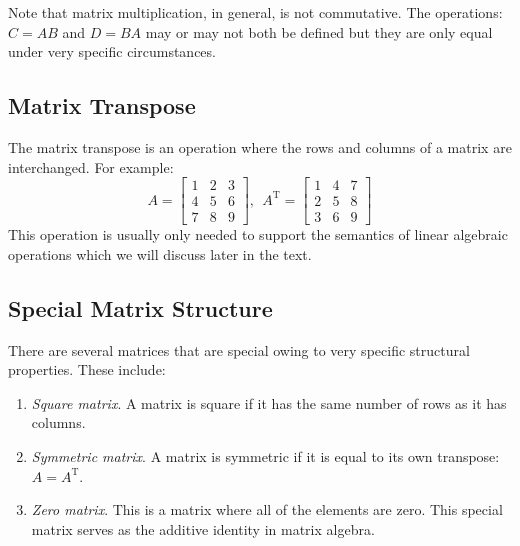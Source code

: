 Note that matrix multiplication, in general, is not commutative.  The operations: $C = AB$ and $D=BA$ may or may not both be defined but they are only equal under very specific circumstances.

\subsection{Matrix Transpose}
The matrix transpose is an operation where the rows and columns of a matrix are interchanged.  For example:
\begin{equation*}A = 
\left[
\begin{matrix}
1 & 2 & 3 \\
4 & 5 & 6 \\
7 & 8 & 9
\end{matrix}
\right], \ \ 
A^{\text{T}} = 
\left[
\begin{matrix}
1 & 4 & 7 \\
2 & 5 & 8 \\
3 & 6 & 9
\end{matrix}
\right]
\end{equation*}
This operation is usually only needed to support the semantics of linear algebraic operations which we will discuss later in the text.

\subsection{Special Matrix Structure}
There are several matrices that are special owing to very specific structural properties.  These include:
\begin{enumerate}
\item \emph{Square matrix}.  A matrix is square if it has the same number of rows as it has columns.

\item \emph{Symmetric matrix}. A matrix is symmetric if it is equal to its own transpose: $A = A^{\text{T}}$.

\item \emph{Zero matrix}. This is a matrix where all of the elements are zero.  This special matrix serves as the additive identity in matrix algebra.

\end{enumerate}


